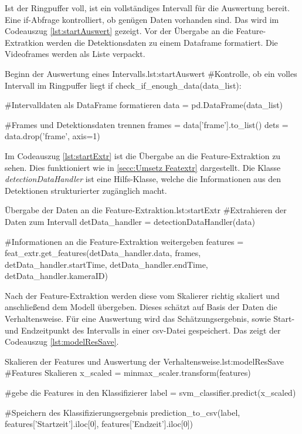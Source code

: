 Ist der Ringpuffer voll, ist ein vollständiges Intervall für die Auswertung bereit. Eine if-Abfrage kontrolliert, ob genügen Daten vorhanden sind. Das wird im Codeauszug \ref{lst:startAuswert} gezeigt. Vor der Übergabe an die Feature-Extratkion werden die Detektionsdaten zu einem Dataframe formatiert. Die Videoframes werden als Liste verpackt. 

\begin{pythoncode}{Beginn der Auswertung eines Intervalls.}{lst:startAuswert}
#Kontrolle, ob ein volles Intervall im Ringpuffer liegt
if check_if_enough_data(data_list):

    #Intervalldaten als DataFrame formatieren 
    data = pd.DataFrame(data_list)

    #Frames und Detektionsdaten trennen 
    frames = data['frame'].to_list()
    dets = data.drop('frame', axis=1)
\end{pythoncode}

Im Codeauszug \ref{lst:startExtr} ist die Übergabe an die Feature-Extraktion zu sehen. Dies funktioniert wie in \autoref{secc:Umsetz Featextr} dargestellt. Die Klasse \textit{detectionDataHandler} ist eine Hilfs-Klasse, welche die Informationen aus den Detektionen strukturierter zugänglich macht. 

\begin{pythoncode}{Übergabe der Daten an die Feature-Extraktion.}{lst:startExtr}
#Extrahieren der Daten zum Intervall 
detData_handler = detectionDataHandler(data)

#Informationen an die Feature-Extraktion weitergeben
features = feat_extr.get_features(detData_handler.data, 
                                frames, 
                                detData_handler.startTime, 
                                detData_handler.endTime, 
                                detData_handler.kameraID)
\end{pythoncode}

Nach der Feature-Extraktion werden diese vom Skalierer richtig skaliert und anschließend dem Modell übergeben. Dieses schätzt auf Basis der Daten die Verhaltensweise. Für eine Auswertung wird das Schätzungsergebnis, sowie Start- und Endzeitpunkt des Intervalls in einer csv-Datei gespeichert. Das zeigt der Codeauszug \ref{lst:modelResSave}.

\begin{pythoncode}{Skalieren der Features und Auswertung der Verhaltensweise.}{lst:modelResSave}
#Features Skalieren
x_scaled = minmax_scaler.transform(features) 

#gebe die Features in den Klassifizierer
label = svm_classifier.predict(x_scaled)

#Speichern des Klassifizierungsergebnis
prediction_to_csv(label, 
                  features['Startzeit'].iloc[0], 
                  features['Endzeit'].iloc[0])
\end{pythoncode}


                